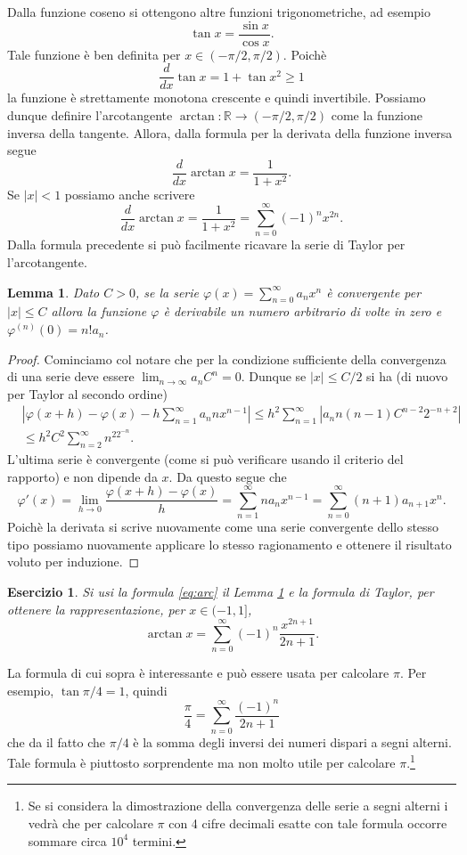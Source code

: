 \documentclass{amsart}
\numberwithin{equation}{section}
\newtheorem{lem}[thm]{Lemma}
\newtheorem{es}[thm]{Esercizio}
\newcommand\bR{{\mathbb R}}
\newcommand\vf{\varphi}
\begin{document}
Dalla funzione coseno si ottengono altre funzioni trigonometriche, ad esempio
\[
\tan x=\frac{\sin x}{\cos x}.
\]
Tale funzione \`e ben definita per $x\in (-\pi/2, \pi/2)$. Poich\`e
\[
\frac d{dx}\tan x=1+\tan x^2\geq 1
\]
la funzione \`e strettamente monotona crescente e quindi invertibile. Possiamo dunque definire l'arcotangente $\arctan :\bR\to  (-\pi/2, \pi/2)$ come la funzione inversa della tangente.
Allora, dalla formula per la derivata della funzione inversa segue
\[
\frac d{dx}\arctan x=\frac 1{1+x^2}.
\]
Se $|x|<1$ possiamo anche scrivere
\begin{equation}\label{eq:arc}
\frac d{dx}\arctan x=\frac 1{1+x^2}=\sum_{n=0}^\infty (-1)^nx^{2n}.
\end{equation}
Dalla formula precedente si pu\`o facilmente ricavare la serie di Taylor per l'arcotangente.
\begin{lem}\label{lem:serie}
Dato $C>0$, se la serie $\vf(x)=\sum_{n=0}^\infty a_n x^n$ \`e convergente per $|x|\leq C$ allora la funzione $\vf$ \`e derivabile un numero arbitrario di volte in zero e $\vf^{(n)}(0)=n! a_n$.
\end{lem}
\begin{proof}
Cominciamo col notare che per la condizione sufficiente della convergenza di una serie deve essere $\lim_{n\to\infty}a_nC^n=0$. Dunque se $|x|\leq C/2$ si ha (di nuovo per Taylor al secondo ordine)
\[
\begin{split}
&\left| \vf(x+h)-\vf(x)-h\sum_{n=1}^\infty a_n nx^{n-1}\right|\leq h^2\sum_{n=1}^\infty\left|a_n n(n-1)C^{n-2}2^{-n+2}\right|\\
&\leq h^2C^2\sum_{n=2}^\infty n^22^{-n}.
\end{split}
\]
L'ultima serie \`e convergente (come si pu\`o verificare usando il criterio del rapporto) e non dipende da $x$. Da questo segue che
\[
\vf'(x)=\lim_{h\to 0}\frac{\vf(x+h)-\vf(x)}{h}=\sum_{n=1}^\infty na_n x^{n-1}=\sum_{n=0}^\infty (n+1)a_{n+1} x^n.
\]
Poich\`e la derivata si scrive nuovamente come una serie convergente dello stesso tipo possiamo nuovamente applicare lo stesso ragionamento e ottenere il risultato voluto per induzione.
\end{proof}
\begin{es} \label{es:arc}Si usi la formula \eqref{eq:arc} il Lemma \ref{lem:serie} e la formula di Taylor, per ottenere la rappresentazione, per $x\in (-1,1]$,
\[
\arctan x=\sum_{n=0}^\infty (-1)^n\frac{x^{2n+1}}{2n+1}.
\]
\end{es}
La formula di cui sopra \`e interessante e pu\`o essere usata per calcolare $\pi$. Per esempio, $\tan \pi/4=1$, quindi
\[
\frac \pi 4=\sum_{n=0}^\infty \frac{(-1)^n}{2n+1}
\]
che da il fatto che $\pi/4$ \`e la somma degli inversi dei numeri dispari a segni alterni. Tale formula \`e piuttosto sorprendente ma non molto utile per calcolare $\pi$.\footnote{Se si considera la dimostrazione della convergenza delle serie a segni alterni i vedr\`a che per calcolare $\pi$ con 4 cifre decimali esatte con tale formula occorre sommare circa $10^4$ termini.}
\end{document}
